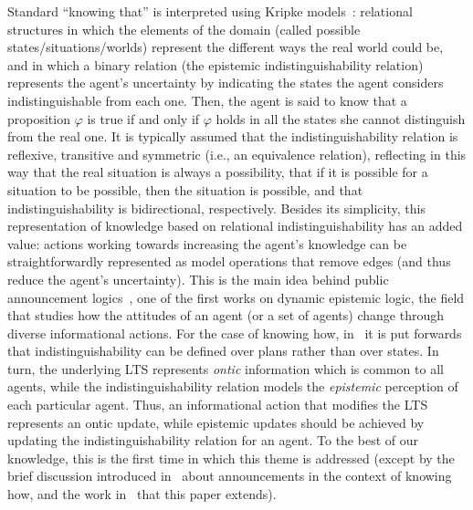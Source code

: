 Standard ``knowing that'' is interpreted using Kripke models~\cite{mlbook,HML}: relational structures in which the elements of the domain (called possible states/situations/worlds) represent the different ways the real world could be, and in which a binary relation (the epistemic indistinguishability relation) represents the agent's uncertainty by indicating the states the agent considers indistinguishable from each one. Then, the agent is said to know that a proposition $\varphi$ is true if and only if $\varphi$ holds in all the states she cannot distinguish from the real one. It is typically assumed that the indistinguishability relation is reflexive, transitive and symmetric (i.e., an equivalence relation), reflecting in this way that the real situation is always a possibility, that if it is possible for a situation to be possible, then the situation is possible, and that indistinguishability is bidirectional, respectively. Besides its simplicity, this representation of knowledge based on relational indistinguishability has an added value: actions working towards increasing the agent's knowledge can be straightforwardly represented as model operations that remove edges (and thus reduce the agent's uncertainty). This is the main idea behind public announcement logics~\cite{Plaza89:lopc}, one of the first works on dynamic epistemic logic, the field that studies how the attitudes of an agent (or a set of agents) change through diverse informational actions. For the case of knowing how, in~\cite{AFSVQ21,AFSVQ23report} it is put forwards that indistinguishability can be defined over plans rather than over states. In turn, the underlying LTS represents \emph{ontic} information which is common to all agents, while the indistinguishability relation models the \emph{epistemic} perception of each particular agent. Thus, an informational action that modifies the LTS represents an ontic update, while epistemic updates should be achieved by updating the indistinguishability relation for an agent. 
To the best of our knowledge, this is the first time in which this theme is addressed (except by the brief discussion introduced in~\cite{Wang2016} about announcements in the context of knowing how, and the work in~\cite{AFSV22} that this paper extends). 

